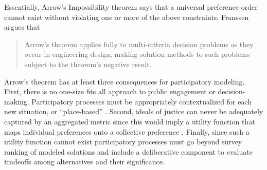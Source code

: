 Essentially, Arrow's Impossibility theorem says that a universal preference
order cannot exist without violating one or more of the above constraints.
Franssen argues that \blockcquote[p. 42]{franssen_arrows_2005}{Arrow’s theorem
applies fully to multi-criteria decision problems as they occur in engineering
design, making solution methods to such problems subject to the theorem’s
negative result.} Arrow's theorem has at least three consequences for
participatory modeling. First, there is no one-size fits all approach to public
engagement or decision-making. Participatory processes must be appropriately
contextualized for each new situation, or ``place-based''
\cite{elmallah_frontlining_2022}. Second, ideals of justice can never be
adequately captured by an aggregated metric since this would imply a utility
function that maps individual preferences onto a collective preference
\cite{jafino_enabling_2021}. Finally, since such a utility function cannot exist
participatory processes must go beyond survey ranking of modeled solutions and
include a deliberative component to evaluate tradeoffs among alternatives and
their significance.